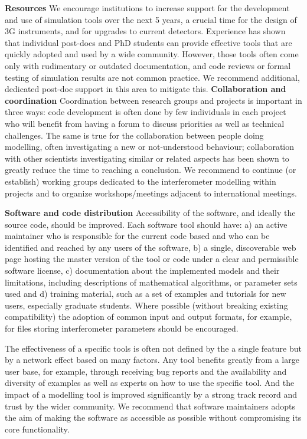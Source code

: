 \textbf{Resources}
We encourage institutions to increase support for the development and use of simulation tools over the next 5 years, a crucial time for the design of 3G instruments, and for upgrades to current detectors.
Experience has shown that
individual post-docs and PhD students can provide effective tools that are quickly adopted and used by a wide community. However, those tools often come only with rudimentary or outdated documentation, and code reviews or formal testing of simulation results are not common practice. We recommend additional, dedicated post-doc support in this area to mitigate this.
\textbf{Collaboration and coordination}
Coordination between research groups and projects is important in three ways:
code development is often done by few individuals in each project who will benefit from having a forum to discuss priorities as well as technical challenges. The same is true for the collaboration between people
doing modelling, often 
investigating a new or not-understood behaviour;
collaboration with other scientists investigating similar or related aspects has been shown to greatly reduce the time to reaching a conclusion. We recommend to continue (or establish) working groups dedicated to the interferometer modelling within projects and 
to organize workshops/meetings adjacent to international meetings.

\textbf{Software and code distribution}
Accessibility of the software, and ideally the source code, should be improved. Each software tool should have: a) an active maintainer who is responsible for the current code based and who can be identified and reached by any users of the software, b) a single, discoverable web page hosting the master version of the tool or code under a clear and permissible software license, c) documentation about the implemented models and their limitations, including descriptions of mathematical algorithms, or parameter sets used and d) training material, such as a set of examples and tutorials for new users, especially graduate students. Where possible (without breaking existing compatibility) the adoption of common  input and output formats, for example, for files storing interferometer parameters  should be encouraged.

The effectiveness of a specific tools is often not defined by the a single feature but by a network effect based on many factors. Any tool benefits greatly from a large user base, for example, through receiving bug reports and the availability and diversity of examples as well as experts on how to use the specific tool. And the impact of a modelling tool is improved significantly by a strong track record and trust by the wider community. We recommend that software maintainers adopts the aim of making the software as accessible as possible without compromising its core functionality. %


